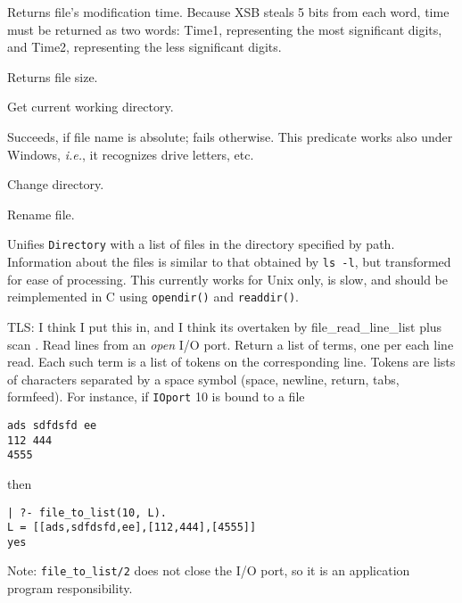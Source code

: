 {

Returns file's modification time. Because XSB steals 5 bits from each
word, time must be returned as two words: Time1, representing the most
significant digits, and Time2, representing the less significant
digits.


Returns file size.

Get current working directory.

 Succeeds, if file name is absolute; fails
otherwise.  This predicate works also under Windows, {\it
i.e.}, it recognizes drive letters, etc.

Change directory.

Rename file.


Unifies {\tt Directory} with a list of files in the directory specified by
path.  Information about the files is similar to that obtained by {\tt ls
  -l}, but transformed for ease of processing.  This currently works for
Unix only, is slow, and should be reimplemented in C using {\tt opendir()}
and {\tt readdir()}.

TLS: I think I put this in, and I think its overtaken by
file_read_line_list plus scan . 
Read lines from an \emph{open} I/O port. Return a
list of terms, one per each line read. Each such term is a list of tokens
on the corresponding line.  Tokens are lists of characters separated by a
space symbol (space, newline, return, tabs, formfeed). For instance, if
{\tt IOport} 10 is bound to a file
\begin{verbatim}
ads sdfdsfd ee
112 444
4555  
\end{verbatim}
then
\begin{verbatim}
| ?- file_to_list(10, L).  
L = [[ads,sdfdsfd,ee],[112,444],[4555]]
yes
\end{verbatim}
Note: {\tt file\_to\_list/2} does not close the I/O port, so it is an
application program responsibility.


}
